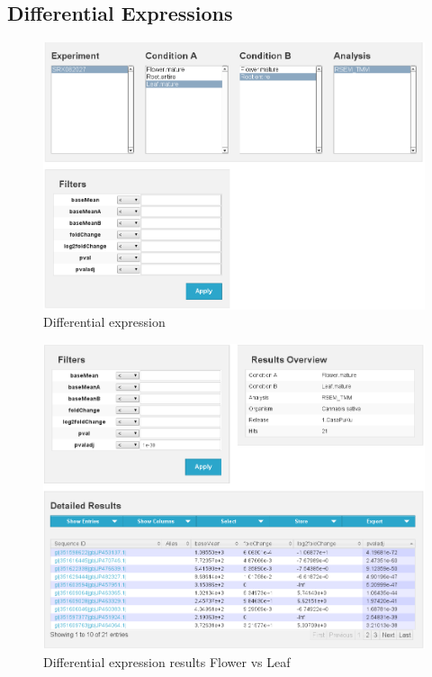 \documentclass[english]{scrartcl}
\begin{document}
\subsection{Differential Expressions}
\begin{figure}
\begin{center}
  \includegraphics[width=\textwidth]{figures/diffexp.png}
  \caption{Differential expression}
  \label{fig:diffexp}
\end{center}
\end{figure}
\begin{figure}
\begin{center}
  \includegraphics[width=\textwidth]{figures/diffexp_results.png}
  \caption{Differential expression results Flower vs Leaf}
  \label{fig:diffexp_results}
\end{center}
\end{figure}
\end{document}
